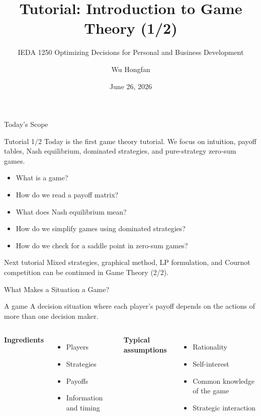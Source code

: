\documentclass[10pt,aspectratio=169]{beamer}
\title[Game Theory Tutorial 1/2]{Tutorial: Introduction to Game Theory (1/2)}
\subtitle{IEDA 1250 Optimizing Decisions for Personal and Business Development}
\author{Wu Hongfan}
\institute{The Hong Kong University of Science and Technology}
\date{June 26, 2026}
\begin{document}
\begin{frame}
  \titlepage
\end{frame}

\begin{frame}{Today's Scope}
\begin{block}{Tutorial 1/2}
Today is the first game theory tutorial. We focus on intuition, payoff tables, Nash equilibrium, dominated strategies, and pure-strategy zero-sum games.
\end{block}
\vspace{0.2cm}
\begin{itemize}
  \item What is a game?
  \item How do we read a payoff matrix?
  \item What does Nash equilibrium mean?
  \item How do we simplify games using dominated strategies?
  \item How do we check for a saddle point in zero-sum games?
\end{itemize}
\vspace{0.2cm}
\begin{alertblock}{Next tutorial}
Mixed strategies, graphical method, LP formulation, and Cournot competition can be continued in Game Theory (2/2).
\end{alertblock}
\end{frame}

\begin{frame}{What Makes a Situation a Game?}
\begin{block}{A game}
A decision situation where each player's payoff depends on the actions of more than one decision maker.
\end{block}
\vspace{0.2cm}
\begin{columns}[T]
\textbf{Ingredients}
\begin{itemize}
  \item Players
  \item Strategies
  \item Payoffs
  \item Information and timing
\end{itemize}
\textbf{Typical assumptions}
\begin{itemize}
  \item Rationality
  \item Self-interest
  \item Common knowledge of the game
  \item Strategic interaction
\end{itemize}
\end{columns}
\end{frame}
\end{document}
